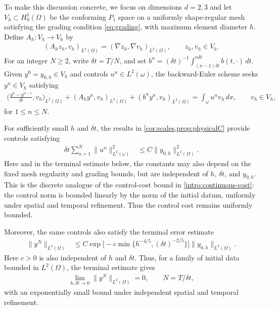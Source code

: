 \documentclass[print,wide,eng]{draft}
\begin{document}
To make this discussion concrete, we focus on dimensions $d=2,3$ and let $V_h\subset H_0^1(\Omega)$ be the conforming $P_1$ space on a uniformly shape-regular mesh satisfying the grading condition \cref{eq:grading}, with maximum element diameter $h$. Define $A_h:V_h\to V_h$ by
%
\begin{align*}
(A_hz_h,v_h)_{L^2(\Omega)}=(\nabla z_h,\nabla v_h)_{L^2(\Omega)},
\qquad z_h,v_h\in V_h.
\end{align*}
%
For an integer $N\geq2$, write $\delta t=T/N$, and set
$b^n=(\delta t)^{-1}\int_{(n-1)\delta t}^{n\delta t}b(t,\cdot)\,dt$.
Given $y^0=y_{0,h}\in V_h$ and controls $u^n\in L^2(\omega)$, the backward-Euler scheme seeks $y^n\in V_h$ satisfying
%
\begin{align}\label{intro:discrete-model}
\biggl(\frac{y^n-y^{n-1}}{\delta t},v_h\biggr)_{L^2(\Omega)}
+(A_hy^n,v_h)_{L^2(\Omega)}+(b^ny^n,v_h)_{L^2(\Omega)}
=\int_\omega u^nv_h\,dx,
\qquad v_h\in V_h,
\end{align}
%
for $1\leq n\leq N$.

For sufficiently small $h$ and $\delta t$, the results in \cref{cor:scales,prop:physicalC} provide controls satisfying
%
\begin{align}\label{intro:control-bounds}
\delta t\sum_{n=1}^N\|u^n\|_{L^2(\omega)}^2
&\leq C\|y_{0,h}\|_{L^2(\Omega)}^2.
\end{align}
%
Here and in the terminal estimate below, the constants may also depend on the fixed mesh regularity and grading bounds, but are independent of $h$, $\delta t$, and $y_{0,h}$.
This is the discrete analogue of the control-cost bound in \cref{intro:continuous-cost}: the control norm is bounded linearly by the norm of the initial datum, uniformly under spatial and temporal refinement. Thus the control cost remains uniformly bounded.

Moreover, the same controls also satisfy the terminal error estimate
%
\begin{align}\label{intro:terminal-error}
\|y^N\|_{L^2(\Omega)}
&\leq C\exp\!\big[-c\min\{h^{-4/5},(\delta t)^{-2/5}\}\big]
\|y_{0,h}\|_{L^2(\Omega)}.
\end{align}
%
Here $c>0$ is also independent of $h$ and $\delta t$.
Thus, for a family of initial data bounded in $L^2(\Omega)$, the terminal estimate gives
\begin{align*}
\lim_{h,\delta t\to0}\|y^N\|_{L^2(\Omega)}=0,
\qquad N=T/\delta t,
\end{align*}
with an exponentially small bound under independent spatial and temporal refinement.
\end{document}
